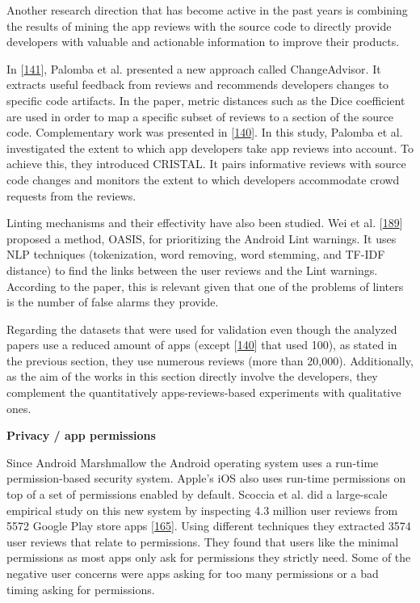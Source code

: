 \documentclass[]{book}
\begin{document}
Another research direction that has become active in the past years is
combining the results of mining the app reviews with the source code to
directly provide developers with valuable and actionable information to
improve their products.

In {[}\protect\hyperlink{ref-palomba2017recommending}{141}{]}, Palomba
et al. presented a new approach called ChangeAdvisor. It extracts useful
feedback from reviews and recommends developers changes to specific code
artifacts. In the paper, metric distances such as the Dice coefficient
are used in order to map a specific subset of reviews to a section of
the source code. Complementary work was presented in
{[}\protect\hyperlink{ref-palomba2018crowdsourcing}{140}{]}. In this
study, Palomba et al. investigated the extent to which app developers
take app reviews into account. To achieve this, they introduced CRISTAL.
It pairs informative reviews with source code changes and monitors the
extent to which developers accommodate crowd requests from the reviews.

Linting mechanisms and their effectivity have also been studied. Wei et
al. {[}\protect\hyperlink{ref-wei2017oasis}{189}{]} proposed a method,
OASIS, for prioritizing the Android Lint warnings. It uses NLP
techniques (tokenization, word removing, word stemming, and TF-IDF
distance) to find the links between the user reviews and the Lint
warnings. According to the paper, this is relevant given that one of the
problems of linters is the number of false alarms they provide.

Regarding the datasets that were used for validation even though the
analyzed papers use a reduced amount of apps (except
{[}\protect\hyperlink{ref-palomba2018crowdsourcing}{140}{]} that used
100), as stated in the previous section, they use numerous reviews (more
than 20,000). Additionally, as the aim of the works in this section
directly involve the developers, they complement the quantitatively
apps-reviews-based experiments with qualitative ones.

\textbf{Privacy / app permissions}

Since Android Marshmallow the Android operating system uses a run-time
permission-based security system. Apple's iOS also uses run-time
permissions on top of a set of permissions enabled by default. Scoccia
et al. did a large-scale empirical study on this new system by
inspecting 4.3 million user reviews from 5572 Google Play store apps
{[}\protect\hyperlink{ref-scoccia2018investigation}{165}{]}. Using
different techniques they extracted 3574 user reviews that relate to
permissions. They found that users like the minimal permissions as most
apps only ask for permissions they strictly need. Some of the negative
user concerns were apps asking for too many permissions or a bad timing
asking for permissions.
\end{document}
